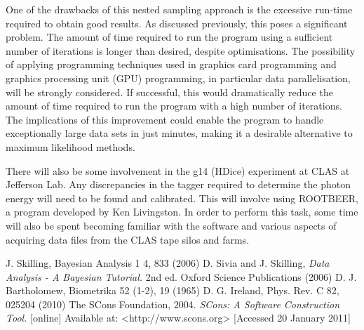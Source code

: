 \documentclass[a4paper,12pt]{article}
\begin{document}
One of the drawbacks of this nested sampling approach is the excessive run-time required to obtain good results.  As discussed previously, this poses a significant problem.  The amount of time required to run the program using a sufficient number of iterations is longer than desired, despite optimisations.  The possibility of applying programming techniques used in graphics card programming and graphics processing unit (GPU) programming, in particular data parallelisation, will be strongly considered.  If successful, this would dramatically reduce the amount of time required to run the program with a high number of iterations. The implications of this improvement could enable the program to handle exceptionally large data sets in just minutes, making it a desirable alternative to maximum likelihood methods.

There will also be some involvement in the g14 (HDice) experiment at CLAS at Jefferson Lab. Any discrepancies in the tagger required to determine the photon energy will need to be found and calibrated.  This will involve using ROOTBEER, a program developed by Ken Livingston.  In order to perform this task, some time will also be spent becoming familiar with the software and various aspects of acquiring data files from the CLAS tape silos and farms. 


\begin{thebibliography}{99}

 J. Skilling, Bayesian Analysis 1 4, 833 (2006)
 D. Sivia and J. Skilling, \textit{Data Analysis - A Bayesian Tutorial.} 2nd ed. Oxford Science Publications (2006)
 D. J. Bartholomew, Biometrika 52 (1-2), 19 (1965)
 D. G. Ireland, Phys. Rev. C 82, 025204 (2010)
 The SCons Foundation, 2004. \textit{SCons: A Software Construction Tool.} [online] Available at: <http://www.scons.org> [Accessed 20 January 2011]
\end{thebibliography}
\end{document}
